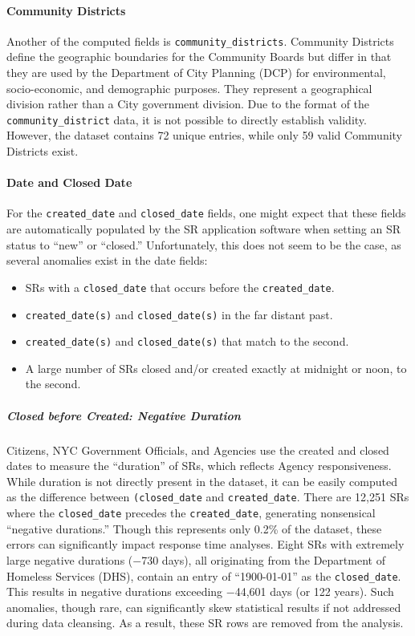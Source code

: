 \documentclass[linenumber]{jdsart}
\begin{document}
\paragraph{Community Districts}
\label{sec:communitydistrict}
Another of the computed fields is \texttt{community\_districts}. 
Community Districts define the geographic boundaries for the Community 
Boards but differ in that they are used by the Department of City 
Planning (DCP) for environmental, socio-economic, and demographic 
purposes. They represent a geographical division rather than a City 
government division. Due to the format of the \texttt{community\_district} 
data, it is not possible to directly establish validity. However, the 
dataset contains 72 unique entries, while only 59 valid Community 
Districts exist.


\paragraph{Date and Closed Date}
\label{sec:negativeduration}
For the \texttt{created\_date} and \texttt{closed\_date} fields, one 
might expect that these fields are automatically populated by the SR 
application software when setting an SR status to ``new'' or ``closed.'' 
Unfortunately, this does not seem to be the case, as several anomalies 
exist in the date fields:
\begin{itemize}
    \item SRs with a \texttt{closed\_date} that occurs before the 
    \texttt{created\_date}.
    \item \texttt{created\_date(s)} and \texttt{closed\_date(s)} in 
    the far distant past.
    \item \texttt{created\_date(s)} and \texttt{closed\_date(s)} that 
    match to the second.
    \item A large number of SRs closed and/or created exactly at midnight 
    or noon, to the second.
\end{itemize}


\subparagraph{Closed before Created: Negative Duration}
Citizens, NYC Government Officials, and Agencies use the created and 
closed dates to measure the ``duration'' of SRs, which reflects Agency 
responsiveness. While duration is not directly present in the dataset, 
it can be easily computed as the difference between
\texttt{(closed\_date} and \texttt{created\_date}.
There are 12,251 SRs where the \texttt{closed\_date} precedes the 
\texttt{created\_date}, generating nonsensical ``negative durations.'' 
Though this represents only 0.2\% of the dataset, these errors can 
significantly impact response time analyses.
Eight SRs with extremely large negative durations ($-$730 days), all 
originating from the Department of Homeless Services (DHS), contain 
an entry of ``1900-01-01'' as the \texttt{closed\_date}. This results 
in negative durations exceeding $-$44,601 days (or 122 years). Such 
anomalies, though rare, can significantly skew statistical results if 
not addressed during data cleansing. As a result, these SR rows are 
removed from the analysis. 
\end{document}
